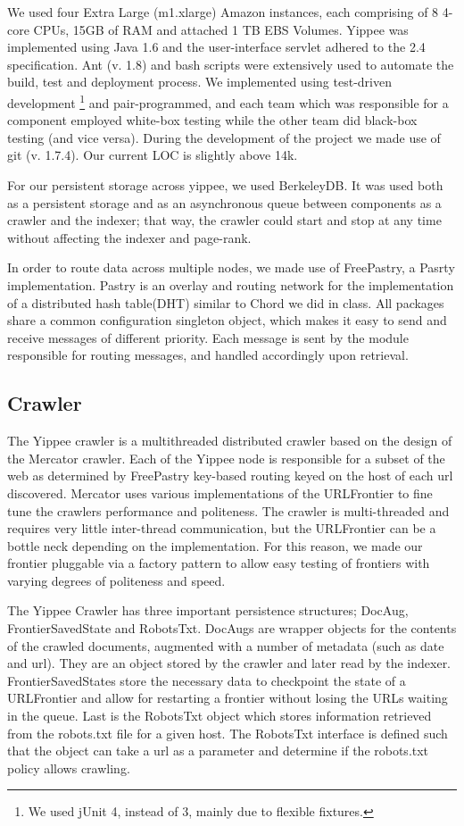 \documentclass[11pt, letterpaper, oneside, twocolumn]{article}
\begin{document}
We used four Extra Large (m1.xlarge) Amazon instances, each comprising of 8 4-core CPUs, 15GB of RAM and attached 1 TB EBS Volumes. 
Yippee was implemented using Java 1.6 and the user-interface servlet adhered to the 2.4 specification. 
Ant (v. 1.8) and bash scripts were extensively used to automate the build, test and deployment process. 
We implemented using test-driven development \footnote{We used jUnit 4, instead of 3, mainly due to flexible fixtures.} and pair-programmed, and each team which was responsible for a component employed white-box testing while the other team did black-box testing (and vice versa). 
During the development of the project we made use of git (v. 1.7.4). 
Our current LOC is slightly above 14k.

For our persistent storage across yippee, we used BerkeleyDB. 
It was used both as a persistent storage and as an asynchronous queue between components as a crawler and the indexer; that way, the crawler could start and stop at any time without affecting the indexer and page-rank.  

In order to route data across multiple nodes, we made use of FreePastry, a Pasrty implementation. 
Pastry is an overlay and routing network for the implementation of a distributed hash table(DHT) similar to Chord we did in class. 
All packages share a common configuration singleton object, which makes
it easy to send and receive messages of different priority. 
Each message is sent by the module responsible for routing messages, and handled accordingly upon retrieval.

\subsection{Crawler}

The Yippee crawler is a multithreaded distributed crawler based on the design of the Mercator crawler\cite{mercator}. 
Each of the Yippee node is responsible for a subset of the web as determined by FreePastry key-based routing keyed on the host of each url discovered.
Mercator uses various implementations of the URLFrontier to fine tune the crawlers performance and politeness.
The crawler is multi-threaded and requires very little inter-thread communication, but the URLFrontier can be a bottle neck depending on the implementation.
For this reason, we made our frontier pluggable via a factory pattern to allow easy testing of frontiers with varying degrees of politeness and speed.


The Yippee Crawler has three important persistence structures; DocAug, FrontierSavedState and RobotsTxt.
DocAugs are wrapper objects for the contents of the crawled documents, augmented with a number of metadata (such as date and url).
They are an object stored by the crawler and later read by the indexer.
FrontierSavedStates store the necessary data to checkpoint the state of a URLFrontier and allow for restarting a frontier without losing the URLs waiting in the queue.
Last is the RobotsTxt object which stores information retrieved from the robots.txt file for a given host.
The RobotsTxt interface is defined such that the object can take a url as a parameter and determine if the robots.txt policy allows crawling.
\end{document}
